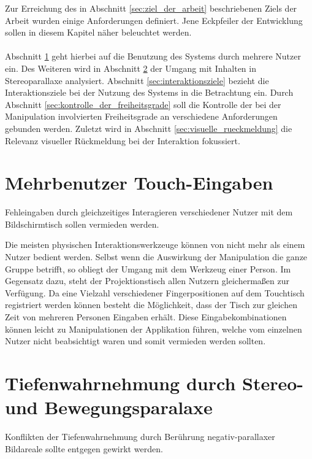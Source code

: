 Zur Erreichung des in Abschnitt \ref{sec:ziel_der_arbeit} beschriebenen Ziels der Arbeit wurden einige Anforderungen definiert. Jene Eckpfeiler der Entwicklung sollen in diesem Kapitel näher beleuchtet werden. 
\\\\
Abschnitt \ref{sec:mehrbenutzer_touch_eingaben} geht hierbei auf die Benutzung des Systems durch mehrere Nutzer ein. Des Weiteren wird in Abschnitt \ref{sec:tiefenwahrnehmung} der Umgang mit Inhalten in Stereoparallaxe analysiert.  Abschnitt \ref{sec:interaktionsziele} bezieht die Interaktionsziele bei der Nutzung des Systems in die Betrachtung ein. Durch Abschnitt \ref{sec:kontrolle_der_freiheitsgrade} soll die Kontrolle der bei der Manipulation involvierten Freiheitsgrade an verschiedene Anforderungen gebunden werden. Zuletzt wird in Abschnitt \ref{sec:visuelle_rueckmeldung} die Relevanz visueller Rückmeldung bei der Interaktion fokussiert. 


\section{Mehrbenutzer Touch-Eingaben}
\label{sec:mehrbenutzer_touch_eingaben}

	\begin{anforderung}
	\label{req:mehrbenutzer}
		Fehleingaben durch gleichzeitiges Interagieren verschiedener Nutzer mit dem Bildschirmtisch sollen vermieden werden.
	\end{anforderung}

Die meisten physischen Interaktionswerkzeuge können von nicht mehr als einem Nutzer bedient werden.  Selbst wenn die Auswirkung der Manipulation die ganze Gruppe betrifft, so obliegt der Umgang mit dem Werkzeug einer Person. Im Gegensatz dazu, steht der Projektionstisch allen Nutzern gleichermaßen zur Verfügung. Da eine Vielzahl verschiedener Fingerpositionen auf dem Touchtisch registriert werden können besteht die Möglichkeit, dass der Tisch zur gleichen Zeit von mehreren Personen Eingaben erhält. Diese Eingabekombinationen können leicht zu Manipulationen der Applikation führen, welche vom einzelnen Nutzer nicht beabsichtigt waren und somit vermieden werden sollten.


\section{Tiefenwahrnehmung durch Stereo- und Bewegungsparalaxe}
\label{sec:tiefenwahrnehmung}

	\begin{anforderung}
	\label{req:wahrnehmungskonflikte}
		Konflikten der Tiefenwahrnehmung durch Berührung negativ-parallaxer Bildareale sollte entgegen gewirkt werden.
	\end{anforderung}

